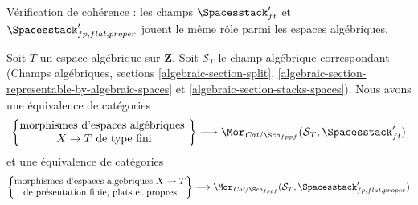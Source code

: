 \noindent
Vérification de cohérence : les champs $\Spacesstack'_{ft}$ et
$\Spacesstack'_{fp, flat, proper}$ jouent le même rôle parmi les espaces
algébriques.

\begin{lemma}
\label{lemma-extend-spaces-to-spaces}
Soit $T$ un espace algébrique sur $\mathbf{Z}$. Soit $\mathcal{S}_T$
le champ algébrique correspondant (Champs algébriques, sections
\ref{algebraic-section-split},
\ref{algebraic-section-representable-by-algebraic-spaces} et
\ref{algebraic-section-stacks-spaces}).
Nous avons une équivalence de catégories
$$
\left\{
\begin{matrix}
\text{morphismes d'espaces algébriques }\\
X \to T\text{ de type fini}
\end{matrix}
\right\}
\longrightarrow
\Mor_{\textit{Cat}/\Sch_{fppf}}(\mathcal{S}_T, \Spacesstack'_{ft})
$$
et une équivalence de catégories
$$
\left\{
\begin{matrix}
\text{morphismes d'espaces algébriques }X \to T\\
\text{de présentation finie, plats et propres}
\end{matrix}
\right\}
\longrightarrow
\Mor_{\textit{Cat}/\Sch_{fppf}}(\mathcal{S}_T,
\Spacesstack'_{fp, flat, proper})
$$
\end{lemma}

